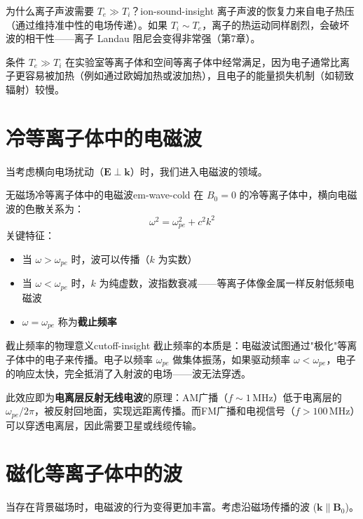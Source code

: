 \documentclass[12pt,a4paper,openany,oneside]{book}
\newcommand{\vect}[1]{\bm{#1}}
\newcommand{\difficulty}[1]{\marginnote{\hfill\textcolor{coverMid!80}{\rule[-0.1em]{2pt}{0.9em}}\,\textcolor{coverMid}{\footnotesize\textbf{[#1]}}}}
\begin{document}
\begin{insight}{为什么离子声波需要 $T_e \gg T_i$？}{ion-sound-insight}
离子声波的恢复力来自电子热压（通过维持准中性的电场传递）。如果 $T_i \sim T_e$，离子的热运动同样剧烈，会破坏波的相干性——离子 Landau 阻尼会变得非常强（第7章）。

条件 $T_e \gg T_i$ 在实验室等离子体和空间等离子体中经常满足，因为电子通常比离子更容易被加热（例如通过欧姆加热或波加热），且电子的能量损失机制（如韧致辐射）较慢。
\end{insight}

\section{冷等离子体中的电磁波}\difficulty{基础}

当考虑横向电场扰动（$\vect{E}\perp\vect{k}$）时，我们进入电磁波的领域。

\begin{theorem}{无磁场冷等离子体中的电磁波}{em-wave-cold}
在 $B_0=0$ 的冷等离子体中，横向电磁波的色散关系为：
\[
\omega^2 = \omega_{pe}^2 + c^2 k^2
\]
关键特征：
\begin{itemize}
\item 当 $\omega > \omega_{pe}$ 时，波可以传播（$k$ 为实数）
\item 当 $\omega < \omega_{pe}$ 时，$k$ 为纯虚数，波指数衰减——等离子体像金属一样反射低频电磁波
\item $\omega = \omega_{pe}$ 称为\textbf{截止频率}
\end{itemize}
\end{theorem}

\begin{insight}{截止频率的物理意义}{cutoff-insight}
截止频率的本质是：电磁波试图通过"极化"等离子体中的电子来传播。电子以频率 $\omega_{pe}$ 做集体振荡，如果驱动频率 $\omega < \omega_{pe}$，电子的响应太快，完全抵消了入射波的电场——波无法穿透。

此效应即为\textbf{电离层反射无线电波}的原理：AM广播（$f\sim 1\,\mathrm{MHz}$）低于电离层的 $\omega_{pe}/2\pi$，被反射回地面，实现远距离传播。而FM广播和电视信号（$f>100\,\mathrm{MHz}$）可以穿透电离层，因此需要卫星或线缆传输。
\end{insight}

\section{磁化等离子体中的波}\difficulty{提高}

当存在背景磁场时，电磁波的行为变得更加丰富。考虑沿磁场传播的波 ($\vect{k}\parallel\vect{B}_0$)。
\end{document}
